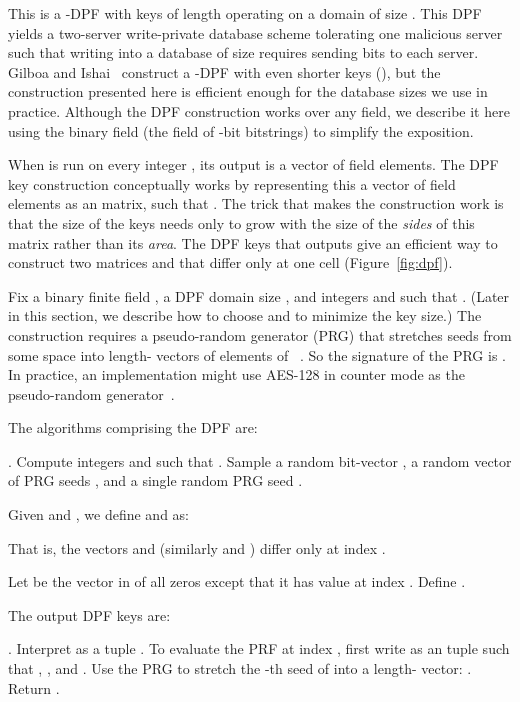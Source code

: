 \documentclass[10pt,twocolumn]{article}
\begin{document}
This is a -DPF with keys of length 
operating on a domain of size .
This DPF yields a two-server write-private database scheme 
tolerating one malicious server such that writing into a database
of size  requires sending  
bits to each server.
Gilboa and Ishai~\cite{gilboa2014distributed} construct
a -DPF with even shorter keys (),
but the construction presented here is efficient enough for the database sizes
we use in practice.
Although the DPF construction works over any field, we
describe it here using the binary field  
(the field of -bit bitstrings) to simplify the exposition.

When  is run on every
integer , 
its output is a vector of  field elements.
The DPF key construction conceptually works by representing this
a vector of  field elements
as an  matrix, such that .
The trick that makes the construction work is that the size of the keys
needs only to grow with the size of the {\em sides} of this matrix
rather than its {\em area}.
The DPF keys that  outputs give an efficient
way to construct two matrices  and  that differ only 
at one cell 
(Figure~\ref{fig:dpf}).


Fix a binary finite field , 
a DPF domain size , and integers  and  such that .
(Later in this section, we describe how to 
choose  and  to minimize the key size.)
The construction requires a pseudo-random generator (PRG)
 that stretches seeds from some space  
into length- vectors of elements of ~\cite{haastad1999pseudorandom}.
So the signature of the PRG is .
In practice, an implementation might use AES-128 
in counter mode as the pseudo-random generator~\cite{nist2001aes}.

The algorithms comprising the DPF are:
\begin{compactitem}
\item
.
Compute integers  and  
such that .
Sample a random bit-vector ,
a random vector of PRG seeds ,
and a single random PRG seed .

Given  and , we define 
 and  as: 

That is, the vectors  and 
(similarly  and ) 
differ only at index .

Let  be the vector in  of all zeros except
that it has value  at index .
Define .

The output DPF keys are:


\item
.
Interpret  as a tuple .
To evaluate the PRF at index , 
first write  as an  tuple such that
, , and .
Use the PRG  to stretch the -th seed
of  into a length- vector: 
.
Return .

\end{compactitem}
\end{document}

